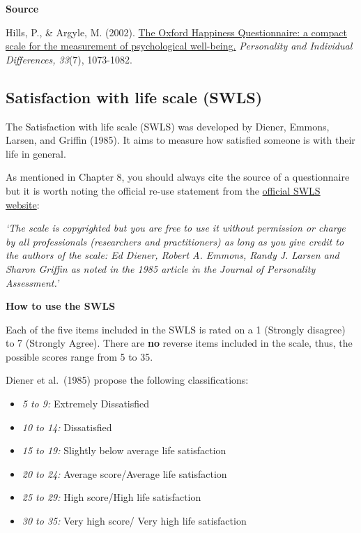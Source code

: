\documentclass[
]{book}
\providecommand{\tightlist}{%
  \setlength{\itemsep}{0pt}\setlength{\parskip}{0pt}}
\begin{document}
\textbf{Source}

Hills, P., \& Argyle, M. (2002). \href{https://pdfs.semanticscholar.org/cadd/7a4eea79e031ec0cf8b8054f668057f33dda.pdf}{The Oxford Happiness Questionnaire: a compact scale for the measurement of psychological well-being.} \emph{Personality and Individual Differences, 33}(7), 1073-1082.

\hypertarget{satisfaction-with-life-scale-swls}{%
\subsection{Satisfaction with life scale (SWLS)}\label{satisfaction-with-life-scale-swls}}

The Satisfaction with life scale (SWLS) was developed by Diener, Emmons, Larsen, and Griffin (1985). It aims to measure how satisfied someone is with their life in general.

As mentioned in Chapter 8, you should always cite the source of a questionnaire but it is worth noting the official re-use statement from the \href{http://labs.psychology.illinois.edu/~ediener/SWLS.html}{official SWLS website}:

\emph{`The scale is copyrighted but you are free to use it without permission or charge by all professionals (researchers and practitioners) as long as you give credit to the authors of the scale: Ed Diener, Robert A. Emmons, Randy J. Larsen and Sharon Griffin as noted in the 1985 article in the Journal of Personality Assessment.'}

\textbf{How to use the SWLS}

Each of the five items included in the SWLS is rated on a 1 (Strongly disagree) to 7 (Strongly Agree). There are \textbf{no} reverse items included in the scale, thus, the possible scores range from 5 to 35.

Diener et al.~(1985) propose the following classifications:

\begin{itemize}
\tightlist
\item
  \emph{5 to 9:} Extremely Dissatisfied
\item
  \emph{10 to 14:} Dissatisfied
\item
  \emph{15 to 19:} Slightly below average life satisfaction
\item
  \emph{20 to 24:} Average score/Average life satisfaction
\item
  \emph{25 to 29:} High score/High life satisfaction
\item
  \emph{30 to 35:} Very high score/ Very high life satisfaction
\end{itemize}
\end{document}
